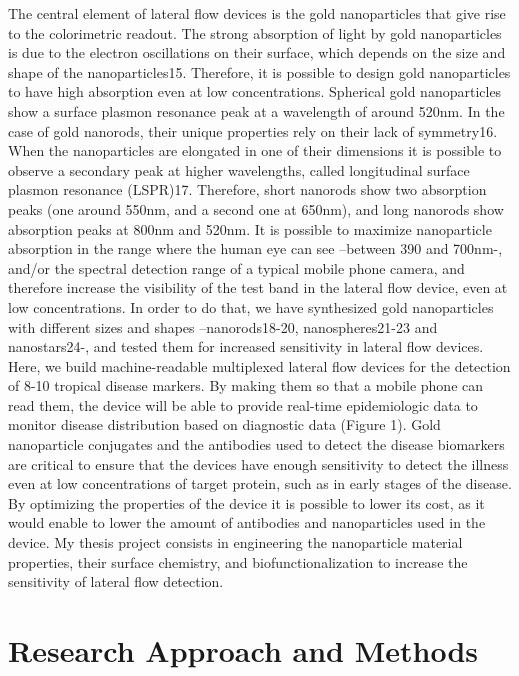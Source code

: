 \documentclass{article}
\begin{document}
The central element of lateral flow devices is the gold nanoparticles that give rise to the colorimetric readout. The strong absorption of light by gold nanoparticles is due to the electron oscillations on their surface, which depends on the size and shape of the nanoparticles15. Therefore, it is possible to design gold nanoparticles to have high absorption even at low concentrations. Spherical gold nanoparticles show a surface plasmon resonance peak at a wavelength of around 520nm. In the case of gold nanorods, their unique properties rely on their lack of symmetry16. When the nanoparticles are elongated in one of their dimensions it is possible to observe a secondary peak at higher wavelengths, called longitudinal surface plasmon resonance (LSPR)17. Therefore, short nanorods show two absorption peaks (one around 550nm, and a second one at 650nm), and long nanorods show absorption peaks at 800nm and 520nm. It is possible to maximize nanoparticle absorption in the range where the human eye can see –between 390 and 700nm-, and/or the spectral detection range of a typical mobile phone camera, and therefore increase the visibility of the test band in the lateral flow device, even at low concentrations. In order to do that, we have synthesized gold nanoparticles with different sizes and shapes –nanorods18-20, nanospheres21-23 and nanostars24-, and tested them for increased sensitivity in lateral flow devices. \\
Here, we build machine-readable multiplexed lateral flow devices for the detection of 8-10 tropical disease markers. By making them so that a mobile phone can read them, the device will be able to provide real-time epidemiologic data to monitor disease distribution based on diagnostic data (Figure 1). Gold nanoparticle conjugates and the antibodies used to detect the disease biomarkers are critical to ensure that the devices have enough sensitivity to detect the illness even at low concentrations of target protein, such as in early stages of the disease. By optimizing the properties of the device it is possible to lower its cost, as it would enable to lower the amount of antibodies and nanoparticles used in the device. My thesis project consists in engineering the nanoparticle material properties, their surface chemistry, and biofunctionalization to increase the sensitivity of lateral flow detection. \\

\newpage
\section{Research Approach and Methods}
\end{document}
